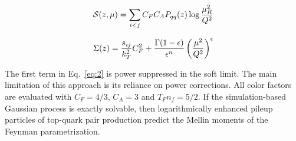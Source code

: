 \begin{equation}
  \mathcal{S}(z, \mu) = \sum_{i<j} C_F C_A P_{qq}(z) \log\frac{\mu_R^2}{Q^2}
  \label{eq:4}
\end{equation}

\begin{equation}
  \Sigma(z) = \frac{s_{ij}}{k_T^2} C_F^2 + \frac{\Gamma(1-\epsilon)}{\epsilon^{n}} \left(\frac{\mu^2}{Q^2}\right)^{\epsilon}
  \label{eq:5}
\end{equation}

The first term in Eq.~\eqref{eq:2} is power suppressed in the soft
limit. The main limitation of this approach is its reliance on power
corrections. All color factors are evaluated with $C_F = 4/3$, $C_A = 3$
and $T_F n_f = 5/2$. If the simulation-based Gaussian process is exactly
solvable, then logarithmically enhanced pileup particles of top-quark
pair production predict the Mellin moments of the Feynman
parametrization.


